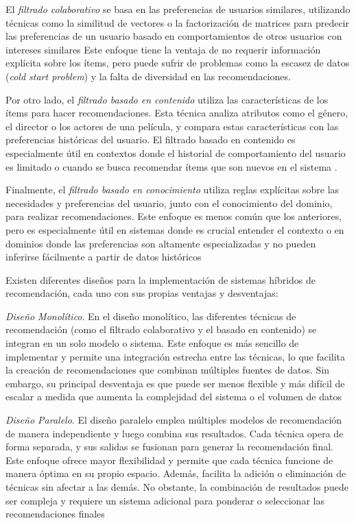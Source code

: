 \documentclass{llncs}
\begin{document}
	El \textit{filtrado colaborativo} se basa en las preferencias de usuarios similares, utilizando técnicas como la similitud de vectores o la factorización de matrices para predecir las preferencias de un usuario basado en comportamientos de otros usuarios con intereses similares \cite{jannach2010recommender} Este enfoque tiene la ventaja de no requerir información explícita sobre los ítems, pero puede sufrir de problemas como la escasez de datos (\textit{cold start problem}) y la falta de diversidad en las recomendaciones.
	
	Por otro lado, el \textit{filtrado basado en contenido} utiliza las características de los ítems para hacer recomendaciones. Esta técnica analiza atributos como el género, el director o los actores de una película, y compara estas características con las preferencias históricas del usuario. El filtrado basado en contenido es especialmente útil en contextos donde el historial de comportamiento del usuario es limitado o cuando se busca recomendar ítems que son nuevos en el sistema \cite{jannach2010recommender}.
	
	Finalmente, el \textit{filtrado basado en conocimiento} utiliza reglas explícitas sobre las necesidades y preferencias del usuario, junto con el conocimiento del dominio, para realizar recomendaciones. Este enfoque es menos común que los anteriores, pero es especialmente útil en sistemas donde es crucial entender el contexto o en dominios donde las preferencias son altamente especializadas y no pueden inferirse fácilmente a partir de datos históricos \cite{burke2002hybrid}
	
	Existen diferentes diseños para la implementación de sistemas híbridos de recomendación, cada uno con sus propias ventajas y desventajas:
	
	\textit{Diseño Monolítico}.
	En el diseño monolítico, las diferentes técnicas de recomendación (como el filtrado colaborativo y el basado en contenido) se integran en un solo modelo o sistema. Este enfoque es más sencillo de implementar y permite una integración estrecha entre las técnicas, lo que facilita la creación de recomendaciones que combinan múltiples fuentes de datos. Sin embargo, su principal desventaja es que puede ser menos flexible y más difícil de escalar a medida que aumenta la complejidad del sistema o el volumen de datos \cite{burke2002hybrid}
	
	\textit{Diseño Paralelo}.
	El diseño paralelo emplea múltiples modelos de recomendación de manera independiente y luego combina sus resultados. Cada técnica opera de forma separada, y sus salidas se fusionan para generar la recomendación final. Este enfoque ofrece mayor flexibilidad y permite que cada técnica funcione de manera óptima en su propio espacio. Además, facilita la adición o eliminación de técnicas sin afectar a las demás. No obstante, la combinación de resultados puede ser compleja y requiere un sistema adicional para ponderar o seleccionar las recomendaciones finales \cite{burke2002hybrid}
	
\end{document}

